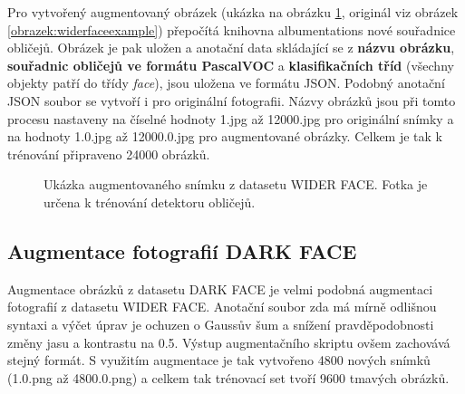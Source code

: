 Pro vytvořený augmentovaný obrázek (ukázka na obrázku \ref{obrazek:augmentovanyobrazek}, originál viz obrázek \ref{obrazek:widerfaceexample}) přepočítá knihovna albumentations nové souřadnice obličejů. Obrázek je pak uložen a anotační data skládající se z \textbf{názvu obrázku}, \textbf{souřadnic obličejů ve formátu PascalVOC} a \textbf{klasifikačních tříd} (všechny objekty patří do třídy \emph{face}), jsou uložena ve formátu JSON. Podobný anotační JSON soubor se vytvoří i pro originální fotografii. Názvy obrázků jsou při tomto procesu nastaveny na číselné hodnoty 1.jpg až 12000.jpg pro originální snímky a na hodnoty 1.0.jpg až 12000.0.jpg pro augmentované obrázky. Celkem je tak k trénování připraveno 24000 obrázků.

\begin{figure}[H]
  \begin{center}
  \label{obrazek:augmentovanyobrazek}
  \caption{Ukázka augmentovaného snímku z datasetu WIDER FACE. Fotka je určena k trénování detektoru obličejů.}
  \end{center}
\end{figure}

\subsection*{Augmentace fotografií DARK FACE}
Augmentace obrázků z datasetu DARK FACE je velmi podobná augmentaci fotografií z datasetu WIDER FACE. Anotační soubor zda má mírně odlišnou syntaxi a výčet úprav je ochuzen o Gaussův šum a snížení pravděpodobnosti změny jasu a kontrastu na 0.5. Výstup augmentačního skriptu ovšem zachovává stejný formát. S využitím augmentace je tak vytvořeno 4800 nových snímků (1.0.png až 4800.0.png) a celkem tak trénovací set tvoří 9600 tmavých obrázků.

